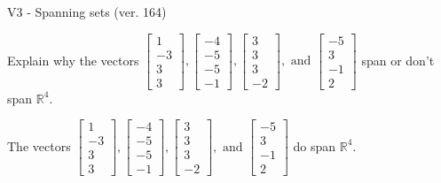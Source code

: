 \begin{exercise}
  \begin{exerciseTitle}V3 - Spanning sets (ver. 164)\end{exerciseTitle}
  \begin{exerciseStatement}
    Explain why the vectors \(\left[\begin{array}{r}
1 \\
-3 \\
3 \\
3
\end{array}\right] , \left[\begin{array}{r}
-4 \\
-5 \\
-5 \\
-1
\end{array}\right] , \left[\begin{array}{r}
3 \\
3 \\
3 \\
-2
\end{array}\right] , \text{ and } \left[\begin{array}{r}
-5 \\
3 \\
-1 \\
2
\end{array}\right]\) span or don't span \(\mathbb{R}^4\). 
	


  \end{exerciseStatement}
  \begin{exerciseAnswer}
   The vectors \(\left[\begin{array}{r}
1 \\
-3 \\
3 \\
3
\end{array}\right] , \left[\begin{array}{r}
-4 \\
-5 \\
-5 \\
-1
\end{array}\right] , \left[\begin{array}{r}
3 \\
3 \\
3 \\
-2
\end{array}\right] , \text{ and } \left[\begin{array}{r}
-5 \\
3 \\
-1 \\
2
\end{array}\right]\) 
  	 do  
	span \(\mathbb{R}^4\).
  


  \end{exerciseAnswer}
\end{exercise}